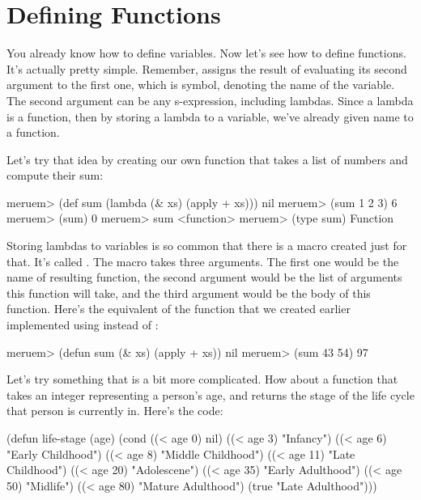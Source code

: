 \begin{REPL}
meruem> (def foo 10)
nil
meruem> (def foo 20)
An error has occurred. foo is already defined.
Source: .home.melvic.meruem.meruem.prelude [1:6}]
(def foo 20)
     ^
\end{REPL}

\section{Defining Functions}
You already know how to define variables. Now let's see how to define functions. It's actually pretty simple. Remember,  assigns the result of evaluating its second argument to the first one, which is symbol, denoting the name of the variable. The second argument can be any s-expression, including lambdas. Since a lambda is a function, then by storing a lambda to a variable, we've already given name to a function. 

Let's try that idea by creating our own function  that takes a list of numbers and compute their sum:

\begin{REPL}
meruem> (def sum (lambda (& xs) (apply + xs)))
nil
meruem> (sum 1 2 3)
6
meruem> (sum)
0
meruem> sum 
<function>
meruem> (type sum)
Function
\end{REPL}

Storing lambdas to variables is so common that there is a macro created just for that. It's called . The  macro takes three arguments. The first one would be the name of resulting function, the second argument would be the list of arguments this function will take, and the third argument would be the body of this function. Here's the equivalent of the  function that we created earlier implemented using  instead of :

\begin{REPL}
meruem> (defun sum (& xs) (apply + xs))
nil
meruem> (sum 43 54)
97
\end{REPL}

Let's try something that is a bit more complicated. How about a function that takes an integer representing a person's age, and returns the stage of the life cycle that person is currently in. Here's the code:

\begin{Meruem}
(defun life-stage (age)
   (cond 
     ((< age 0) nil)
     ((< age 3) "Infancy")
     ((< age 6) "Early Childhood")
     ((< age 8) "Middle Childhood")
     ((< age 11) "Late Childhood")
     ((< age 20) "Adolescene")
     ((< age 35) "Early Adulthood")
     ((< age 50) "Midlife")
     ((< age 80) "Mature Adulthood")
     (true "Late Adulthood")))
\end{Meruem}

